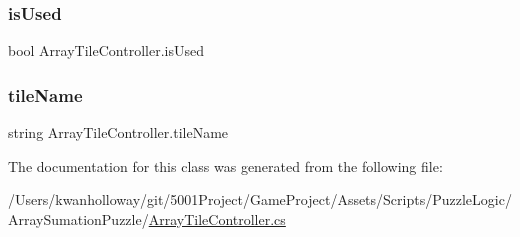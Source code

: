 \mbox{\label{class_array_tile_controller_a3a6ff99fac5882cc1db2be7776818e43}} 
\subsubsection{\texorpdfstring{is\+Used}{isUsed}}
{\footnotesize\ttfamily bool Array\+Tile\+Controller.\+is\+Used}

\mbox{\label{class_array_tile_controller_a9f7d6d4fd87723a3e91209f35bc8d5f6}} 
\subsubsection{\texorpdfstring{tile\+Name}{tileName}}
{\footnotesize\ttfamily string Array\+Tile\+Controller.\+tile\+Name}



The documentation for this class was generated from the following file\+:\begin{DoxyCompactItemize}
\item 
/\+Users/kwanholloway/git/5001\+Project/\+Game\+Project/\+Assets/\+Scripts/\+Puzzle\+Logic/\+Array\+Sumation\+Puzzle/\hyperlink{_array_tile_controller_8cs}{Array\+Tile\+Controller.\+cs}\end{DoxyCompactItemize}
